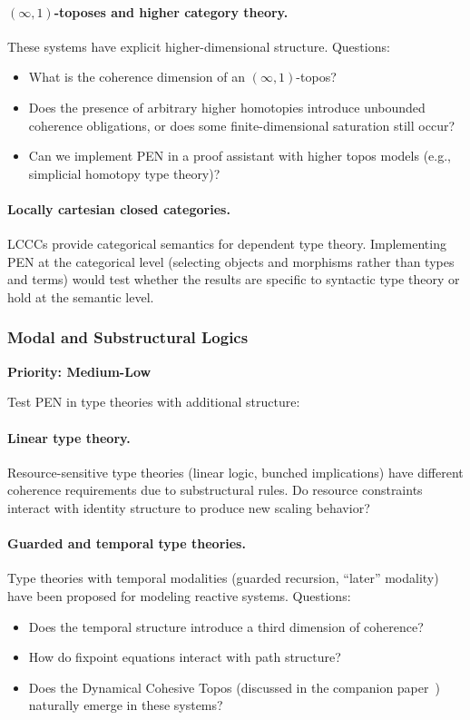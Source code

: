 \documentclass[11pt]{article}
\theoremstyle{definition}
\theoremstyle{remark}
\begin{document}
\paragraph{$(\infty,1)$-toposes and higher category theory.}
These systems have explicit higher-dimensional structure. Questions:
\begin{itemize}
\item What is the coherence dimension of an $(\infty,1)$-topos?
\item Does the presence of arbitrary higher homotopies introduce unbounded coherence obligations,
or does some finite-dimensional saturation still occur?
\item Can we implement PEN in a proof assistant with higher topos models (e.g., simplicial homotopy
type theory)?
\end{itemize}

\paragraph{Locally cartesian closed categories.}
LCCCs provide categorical semantics for dependent type theory. Implementing PEN at the categorical
level (selecting objects and morphisms rather than types and terms) would test whether the results
are specific to syntactic type theory or hold at the semantic level.

\subsubsection{Modal and Substructural Logics}

\textbf{Priority: Medium-Low}

Test PEN in type theories with additional structure:

\paragraph{Linear type theory.}
Resource-sensitive type theories (linear logic, bunched implications) have different coherence
requirements due to substructural rules. Do resource constraints interact with identity structure to
produce new scaling behavior?

\paragraph{Guarded and temporal type theories.}
Type theories with temporal modalities (guarded recursion, ``later'' modality) have been proposed
for modeling reactive systems. Questions:
\begin{itemize}
\item Does the temporal structure introduce a third dimension of coherence?
\item How do fixpoint equations interact with path structure?
\item Does the Dynamical Cohesive Topos (discussed in the companion paper~\cite{lande2025genesis})
naturally emerge in these systems?
\end{itemize}
\end{document}
